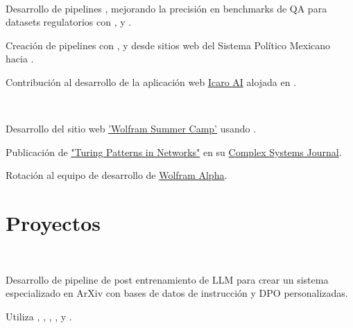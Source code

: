 \documentclass[]{tex/deedy-resume-openfont}
\begin{document}
\begin{minipage}[t]{0.67\textwidth}
\\
\begin{tightemize}
    \item Desarrollo de pipelines , mejorando la precisión en benchmarks de QA para datasets regulatorios con ,  y .
    \item Creación de pipelines  con ,  y  desde sitios web del Sistema Político Mexicano hacia .
    \item Contribución al desarrollo  de la aplicación web \href{http://www.icaro.ai/home/}{Icaro AI} alojada en .
\end{tightemize}
\sectionsep

\\
\begin{tightemize}
    \item Desarrollo del sitio web \href{https://education.wolfram.com/summer-camp/}{'Wolfram Summer Camp'} usando \href{https://www.wolfram.com/wolfram-one/}{}.
    \item Publicación de \href{https://www.complex-systems.com/abstracts/v32_i03_a02/}{"Turing Patterns in Networks"} en su \href{https://www.complex-systems.com/}{Complex Systems Journal}.
    \item Rotación al equipo de desarrollo de \href{https://www.wolframalpha.com/}{Wolfram Alpha}.
\end{tightemize}
\sectionsep


\section{Proyectos}

\\
\begin{tightemize}
    \item Desarrollo de pipeline de post entrenamiento de LLM para crear un sistema especializado en ArXiv con bases de datos de instrucción y DPO personalizadas.
    \item Utiliza , , , ,  y .
\end{tightemize}
\sectionsep


\end{minipage}
\end{document}
